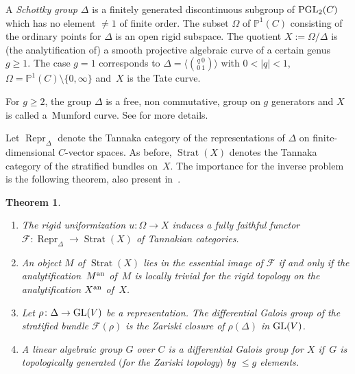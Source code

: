 \documentclass[10pt,a4paper]{amsart}
\numberwithin{equation}{section}
\newtheorem{Theorem}{Theorem}[section]
\begin{document}
A {\it Schottky group $\Delta$} is a finitely generated discontinuous subgroup of ${\rm PGL}_2(C)$ which has no element $\neq 1$ of finite order. The subset $\Omega$ of $\mathbb{P}^1(C)$ consisting of the ordinary points for $\Delta$ is an open rigid subspace. The quotient $X:=\Omega/\Delta$ is (the analytification of) a smooth projective algebraic curve of a certain genus $g\geq 1$. The case $g=1$ corresponds to $\Delta =\big\langle {q\ 0\choose 0\ 1 }\big\rangle$ with $0<|q|<1$, $\Omega =\mathbb{P}^1(C)\setminus \{0,\infty\}$ and~$X$ is the Tate curve.

For $g\geq 2$, the group $\Delta$ is a free, non commutative, group on $g$ generators and $X$ is called a~Mumford curve. See \cite{Ge-vdP} for more details.

Let $\operatorname{Repr}_\Delta$ denote the Tannaka category of the representations of $\Delta$ on finite-dimensional $C$-vector spaces. As before, $\operatorname{Strat}(X)$ denotes the Tannaka category of the stratified bundles on~$X$. The importance for the inverse problem is the following theorem, also present in~\cite{Sa}.

\begin{Theorem}\label{4.2}\quad
\begin{enumerate}\itemsep=0pt
\item[$(1)$] The rigid uniformization $u\colon \Omega \rightarrow X$ induces a fully faithful functor $\mathcal{F}\colon \operatorname{Repr}_\Delta \rightarrow \operatorname{Strat}(X)$ of Tannakian categories.
\item[$(2)$] An object $M$ of $\operatorname{Strat}(X)$ lies in the essential image of $\mathcal{F}$ if and only if the analytifica\-tion~$M^{\rm an}$ of~$M$ is locally trivial for the rigid topology on the analytification $X^{\rm an}$ of~$X$.
\item[$(3)$]Let $\rho\colon \Delta \rightarrow {\rm GL}(V)$ be a representation. The differential Galois group of the stratified bundle $\mathcal{F}(\rho)$ is the Zariski closure of $\rho(\Delta)$ in ${\rm GL}(V)$.
\item[$(3)$]A linear algebraic group $G$ over $C$ is a differential Galois group for $X$ if~$G$ is topologically generated $($for the Zariski topology$)$ by $\leq g$ elements.
\end{enumerate}
\end{Theorem}
\end{document}

